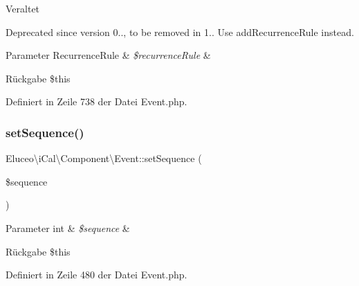 \begin{DoxyRefDesc}{Veraltet}
\item[\mbox{\hyperlink{deprecated__deprecated000031}{Veraltet}}]Deprecated since version 0.., to be removed in 1.. Use add\+Recurrence\+Rule instead.\end{DoxyRefDesc}



\begin{DoxyParams}[1]{Parameter}
Recurrence\+Rule & {\em \$recurrence\+Rule} & \\
\hline
\end{DoxyParams}
\begin{DoxyReturn}{Rückgabe}
\$this 
\end{DoxyReturn}


Definiert in Zeile 738 der Datei Event.\+php.

\mbox{\label{class_eluceo_1_1i_cal_1_1_component_1_1_event_a87725eac37817e617abbe6d1910790e9}} 
\subsubsection{\texorpdfstring{set\+Sequence()}{setSequence()}\hspace{0.1cm}{\footnotesize\ttfamily [1/3]}}
{\footnotesize\ttfamily Eluceo\textbackslash{}i\+Cal\textbackslash{}\+Component\textbackslash{}\+Event\+::set\+Sequence (\begin{DoxyParamCaption}\item[{}]{\$sequence }\end{DoxyParamCaption})}


\begin{DoxyParams}[1]{Parameter}
int & {\em \$sequence} & \\
\hline
\end{DoxyParams}
\begin{DoxyReturn}{Rückgabe}
\$this 
\end{DoxyReturn}


Definiert in Zeile 480 der Datei Event.\+php.

\mbox{\label{class_eluceo_1_1i_cal_1_1_component_1_1_event_a87725eac37817e617abbe6d1910790e9}} 
